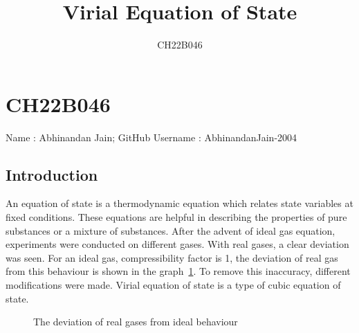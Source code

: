 \documentclass[12pt]{article}
\author{CH22B046}
\title{Virial Equation of State}
\begin{document}
\maketitle
\section{CH22B046}

Name : Abhinandan Jain;
GitHub Username : AbhinandanJain-2004

\subsection{Introduction}
An equation of state is a thermodynamic equation which relates state variables at fixed conditions. These equations are helpful in describing the properties of pure substances or a mixture of substances. After the advent of ideal gas equation, experiments were conducted on different gases. With real gases, a clear deviation was seen. For an ideal gas, compressibility factor is 1, the deviation of real gas from this behaviour is shown in the graph~\ref{Graph}. To remove this inaccuracy, different modifications were made. Virial equation of state is a type of cubic equation of state.

\begin{figure}[ht]
	\begin{center}
	\end{center}
	\caption{The deviation of real gases from ideal behaviour}
	\label{Graph}
\end{figure}
\end{document}
